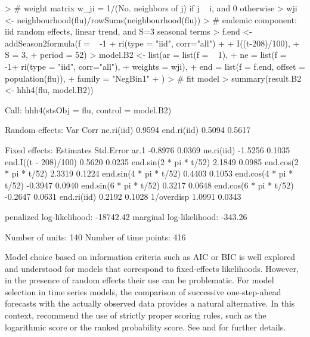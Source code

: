 \documentclass[a4paper,11pt]{article}
\begin{document}
\begin{Schunk}
\begin{Sinput}
> # weight matrix w_ji = 1/(No. neighbors of j) if j ~ i, and 0 otherwise
> wji <- neighbourhood(flu)/rowSums(neighbourhood(flu))
> # endemic component: iid random effects, linear trend, and S=3 seasonal terms
> f.end <- addSeason2formula(f = ~ -1 + ri(type = "iid", corr="all") + 
+                                 I((t-208)/100), 
+                                 S = 3, 
+                                 period = 52)
> model.B2 <- list(ar = list(f = ~ 1),
+                  ne = list(f = ~ -1+ ri(type = "iid", corr="all"), 
+                            weights = wji),
+                  end = list(f = f.end, offset = population(flu)),
+                  family = "NegBin1"
+                  )
> # fit model
> summary(result.B2 <- hhh4(flu, model.B2))
\end{Sinput}
\end{Schunk}
\begin{Schunk}
\begin{Soutput}
Call: 
hhh4(stsObj = flu, control = model.B2)

Random effects: 
            Var    Corr   
ne.ri(iid)  0.9594        
end.ri(iid) 0.5094 0.5617 

Fixed effects: 
                        Estimates  Std.Error
ar.1                      -0.8976     0.0369
ne.ri(iid)                -1.5256     0.1035
end.I((t - 208)/100)       0.5620     0.0235
end.sin(2 * pi * t/52)     2.1849     0.0985
end.cos(2 * pi * t/52)     2.3319     0.1224
end.sin(4 * pi * t/52)     0.4403     0.1053
end.cos(4 * pi * t/52)    -0.3947     0.0940
end.sin(6 * pi * t/52)     0.3217     0.0648
end.cos(6 * pi * t/52)    -0.2647     0.0631
end.ri(iid)                0.2192     0.1028
1/overdisp                 1.0991     0.0343

penalized log-likelihood:  -18742.42 
marginal log-likelihood:   -343.26 

Number of units:          140 
Number of time points:    416 
\end{Soutput}
\end{Schunk}
Model choice based on information criteria such as AIC or BIC is well
explored and understood for models that correspond to fixed-effects likelihoods.
However, in the presence of random effects their use can be problematic.
For model selection in time series models, the comparison of successive 
one-step-ahead forecasts with the actually observed data 
provides a natural alternative. In this context, \cite{gneiting-raftery-2007}
recommend the use of strictly proper scoring 
rules, such as the logarithmic score or the ranked probability score.
See \cite{czado-etal-2009} and \cite{paul-held-2011} for further details.
\end{document}
